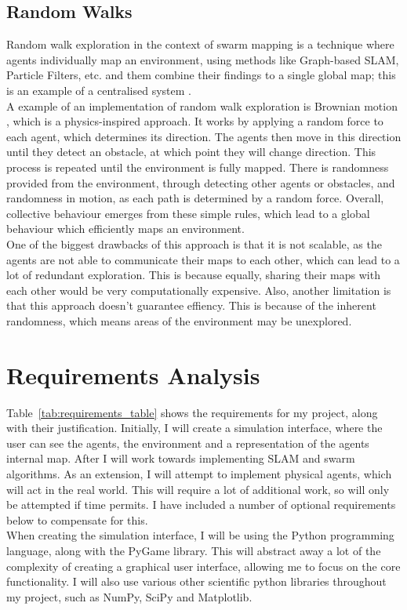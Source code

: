 \documentclass[12pt]{article}
\begin{document}
\subsection{Random Walks}
Random walk exploration in the context of swarm mapping is a technique where agents individually map an environment, using
methods like Graph-based SLAM, Particle Filters, etc. and them combine their findings to a single global map; this is an
example of a centralised system \cite{swarm_random_walks}.\\
A example of an implementation of random walk exploration is Brownian motion \cite{brownian_motion}, which is a physics-inspired
approach. It works by applying a random force to each agent, which determines its direction. The agents then move in this
direction until they detect an obstacle, at which point they will change direction. This process is repeated until the
environment is fully mapped. There is randomness provided from the environment, through detecting other agents or obstacles,
and randomness in motion, as each path is determined by a random force. Overall, collective behaviour emerges from these simple
rules, which lead to a global behaviour which efficiently maps an environment.\\
One of the biggest drawbacks of this approach is that it is not scalable, as the agents are not able to communicate their
maps to each other, which can lead to a lot of redundant exploration. This is because equally, sharing their maps with each
other would be very computationally expensive. Also, another limitation is that this approach doesn't guarantee effiency.
This is because of the inherent randomness, which means areas of the environment may be unexplored.\\


\section{Requirements Analysis}
Table~\ref{tab:requirements_table} shows the requirements for my project, along with their justification. Initially, I will
create a simulation interface, where the user can see the agents, the environment and a representation of the agents internal
map. After I will work towards implementing SLAM and swarm algorithms. As an extension, I will attempt to implement physical
agents, which will act in the real world. This will require a lot of additional work, so will only be attempted if time permits.
I have included a number of optional requirements below to compensate for this.\\
When creating the simulation interface, I will be using the Python programming language, along with the PyGame library. This
will abstract away a lot of the complexity of creating a graphical user interface, allowing me to focus on the core functionality.
I will also use various other scientific python libraries throughout my project, such as NumPy, SciPy and Matplotlib.\\
\end{document}
